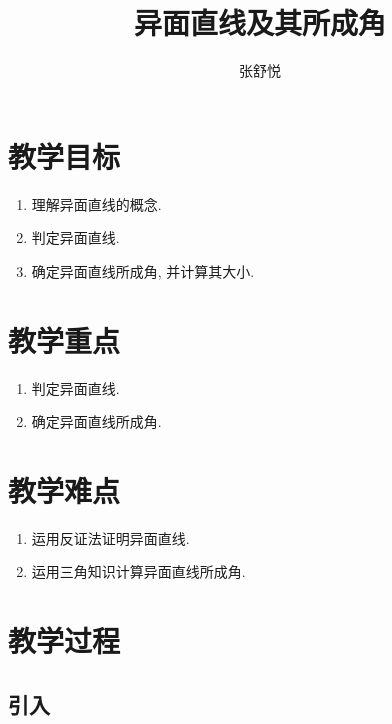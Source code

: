 \documentclass{article}
\begin{document}
\begin{CJK}{UTF8}{gkai}

\title{异面直线及其所成角}
\date{}
\author{张舒悦}
\maketitle

\section{教学目标}
\begin{enumerate}
\item 理解异面直线的概念.
\item 判定异面直线.
\item 确定异面直线所成角, 并计算其大小.
\end{enumerate}

\section{教学重点}
\begin{enumerate}
\item 判定异面直线.
\item 确定异面直线所成角.
\end{enumerate}

\section{教学难点}
\begin{enumerate}
\item 运用反证法证明异面直线.
\item 运用三角知识计算异面直线所成角.
\end{enumerate}

\section{教学过程}
\subsection{引入}

\end{CJK}
\end{document}
